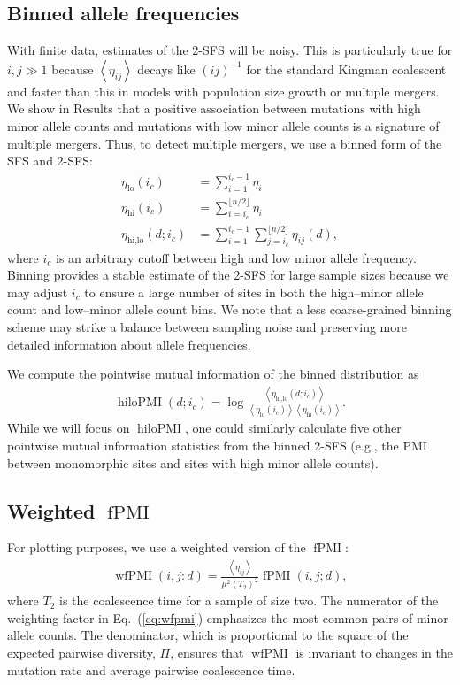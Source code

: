 \documentclass[11pt, letterpaper]{article}   	%
\newcommand{\eq}[1]{Eq.~(\ref{#1})}
\newcommand{\floor}[1]{\lfloor #1 \rfloor}
\newcommand{\E}[1]{\left< #1 \right>}
\DeclareMathOperator{\fpmi}{fPMI}
\DeclareMathOperator{\wfpmi}{wfPMI}
\DeclareMathOperator{\hilopmi}{hiloPMI}
\begin{document}
\subsection*{Binned allele frequencies}

With finite data, estimates of the 2-SFS will be noisy.
This is particularly true for $i,j\gg1$ because $\E{\eta_{ij}}$ decays like $(ij)^{-1}$ for the standard Kingman coalescent \autocite{Fu1995} and faster than this in models with population size growth or multiple mergers.
We show in Results that a positive association between mutations with high minor allele counts and mutations with low minor allele counts is a signature of multiple mergers.
Thus, to detect multiple mergers, we use a binned form of the SFS and 2-SFS:
\begin{align}
    \eta_{\text{lo}}(i_c) &= \sum_{i=1}^{i_c-1} \eta_i \\
    \eta_{\text{hi}}(i_c) &= \sum_{i=i_c}^{\floor{n/2}} \eta_i \\
    \eta_{\text{hi,lo}}(d; i_c) &= \sum_{i=1}^{i_c-1} \sum_{j=i_c}^{\floor{n/2}} \eta_{ij}(d),
\end{align}
where $i_c$ is an arbitrary cutoff between high and low minor allele frequency.
Binning provides a stable estimate of the 2-SFS for large sample sizes because we may adjust $i_c$ to ensure a large number of sites in both the high--minor allele count and low--minor allele count bins.
We note that a less coarse-grained binning scheme may strike a balance between sampling noise and preserving more detailed information about allele frequencies.

We compute the pointwise mutual information of the binned distribution as
\begin{align}
    \hilopmi(d; i_c) = \log \frac
                                {\E{\eta_{\text{hi,lo}}(d; i_c)}}
                                {\E{\eta_{\text{lo}}(i_c)}  \E{\eta_{\text{hi}}(i_c)}}.
\end{align}
While we will focus on $\hilopmi$, one could similarly calculate five other pointwise mutual information statistics from the binned 2-SFS (e.g., the PMI between monomorphic sites and sites with high minor allele counts).


\subsection*{Weighted $\fpmi$}
For plotting purposes, we use a weighted version of the $\fpmi$:
\begin{align}
    \wfpmi(i,j:d) = \frac{\E{\eta_{ij}}}{\mu^2 \E{T_2}^2} \fpmi(i,j;d),
    \label{eq:wfpmi}
\end{align}
where $T_2$ is the coalescence time for a sample of size two.
The numerator of the weighting factor in \eq{eq:wfpmi} emphasizes the most common pairs of minor allele counts.
The denominator, which is proportional to the square of the expected pairwise diversity, $\Pi$, ensures that $\wfpmi$ is invariant to changes in the mutation rate and average pairwise coalescence time.
\end{document}
